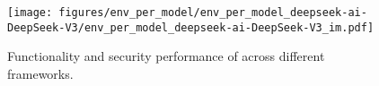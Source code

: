 
\begin{figure}[h]
    \centering
    \texttt{[image: figures/env\_per\_model/env\_per\_model\_deepseek-ai-DeepSeek-V3/env\_per\_model\_deepseek-ai-DeepSeek-V3\_im.pdf]}
    \caption{Functionality and security performance of \dsvt{} across different frameworks.}
    \label{fig:env_per_model_deepseek-ai-DeepSeek-V3}
\end{figure}
